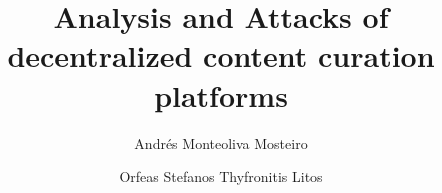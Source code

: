 \title{Analysis and Attacks of decentralized content curation platforms}
\author{Andrés Monteoliva Mosteiro \and Orfeas Stefanos Thyfronitis Litos}
\maketitle
